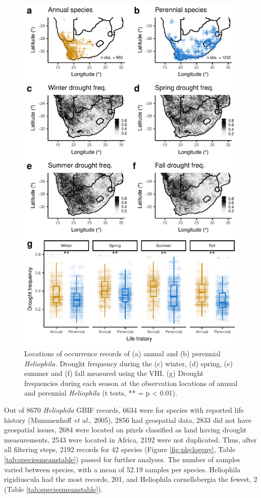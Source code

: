 \documentclass[man,floatsintext]{apa6}
\theoremstyle{definition}
\theoremstyle{definition}
\theoremstyle{definition}
\theoremstyle{remark}
\begin{document}
\begin{figure}[!h]
\includegraphics[width=\textwidth]{../figures/maps_boxplots} \caption{Locations of occurrence records of (a) annual and (b)
perennial \emph{Heliophila.} Drought frequency during the (c) winter,
(d) spring, (e) summer and (f) fall measured using the VHI. (g) Drought
frequencies during each season at the observation locations of annual
and perennial \emph{Heliophila} (t tests, ** = p \textless{} 0.01).}\label{fig:mapsboxplots}
\end{figure}

Out of 8670 \emph{Heliophila} GBIF records, 6634 were for species with
reported life history (Mummenhoff \emph{et al.}, 2005), 2856 had
geospatial data, 2833 did not have geospatial issues, 2684 were located
on pixels classified as land having drought measurements, 2543 were
located in Africa, 2192 were not duplicated. Thus, after all filtering
steps, 2192 records for 42 species (Figure \ref{fig:phylogeny}, Table
\ref{tab:speciesmeanstable}) passed for further analyses. The number of
samples varied between species, with a mean of 52.19 samples per
species. Heliophila rigidiuscula had the most records, 201, and
Heliophila cornellsbergia the fewest, 2 (Table
\ref{tab:speciesmeanstable}).
\end{document}
